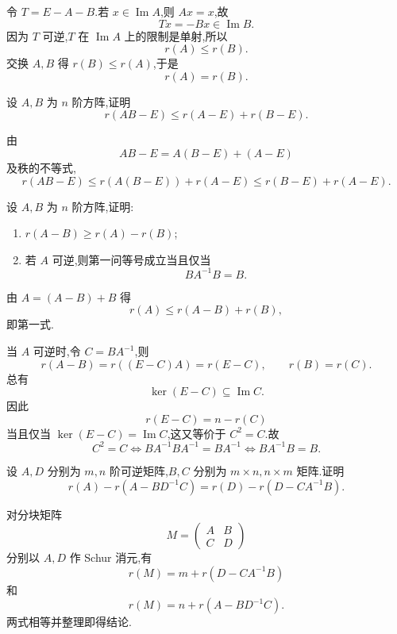 \begin{solution}
令 $T=E-A-B$.若 $x\in\operatorname{Im}A$,则 $Ax=x$,故
\[
 Tx=-Bx\in\operatorname{Im}B.
\]
因为 $T$ 可逆,$T$ 在 $\operatorname{Im}A$ 上的限制是单射,所以
\[
 r(A)\leq r(B).
\]
交换 $A,B$ 得 $r(B)\leq r(A)$,于是
\[
 \boxed{r(A)=r(B)}.
\]
\end{solution}

\begin{example}
设 $A,B$ 为 $n$ 阶方阵,证明
\[
 r(AB-E)\leq r(A-E)+r(B-E).
\]
\end{example}
\exampleblank

\begin{solution}
由
\[
 AB-E=A(B-E)+(A-E)
\]
及秩的不等式,
\[
 r(AB-E)
 \leq r(A(B-E))+r(A-E)
 \leq r(B-E)+r(A-E).
\]
\end{solution}

\begin{example}
设 $A,B$ 为 $n$ 阶方阵,证明:
\begin{enumerate}
  \item $r(A-B)\geq r(A)-r(B)$;
  \item 若 $A$ 可逆,则第一问等号成立当且仅当
  \[
  BA^{-1}B=B.
  \]
\end{enumerate}
\end{example}
\exampleblank

\begin{solution}
由 $A=(A-B)+B$ 得
\[
 r(A)\leq r(A-B)+r(B),
\]
即第一式.

当 $A$ 可逆时,令 $C=BA^{-1}$,则
\[
 r(A-B)=r((E-C)A)=r(E-C),\qquad r(B)=r(C).
\]
总有
\[
 \ker(E-C)\subseteq\operatorname{Im}C.
\]
因此
\[
 r(E-C)=n-r(C)
\]
当且仅当 $\ker(E-C)=\operatorname{Im}C$,这又等价于 $C^2=C$.故
\[
 C^2=C
 \iff BA^{-1}BA^{-1}=BA^{-1}
 \iff \boxed{BA^{-1}B=B}.
\]
\end{solution}

\begin{example}
设 $A,D$ 分别为 $m,n$ 阶可逆矩阵,$B,C$ 分别为 $m\times n,n\times m$ 矩阵.证明
\[
 r(A)-r(A-BD^{-1}C)
 =r(D)-r(D-CA^{-1}B).
\]
\end{example}
\exampleblank

\begin{solution}
对分块矩阵
\[
 M=\begin{pmatrix}A&B\\C&D\end{pmatrix}
\]
分别以 $A,D$ 作 Schur 消元,有
\[
 r(M)=m+r(D-CA^{-1}B)
\]
和
\[
 r(M)=n+r(A-BD^{-1}C).
\]
两式相等并整理即得结论.
\end{solution}

